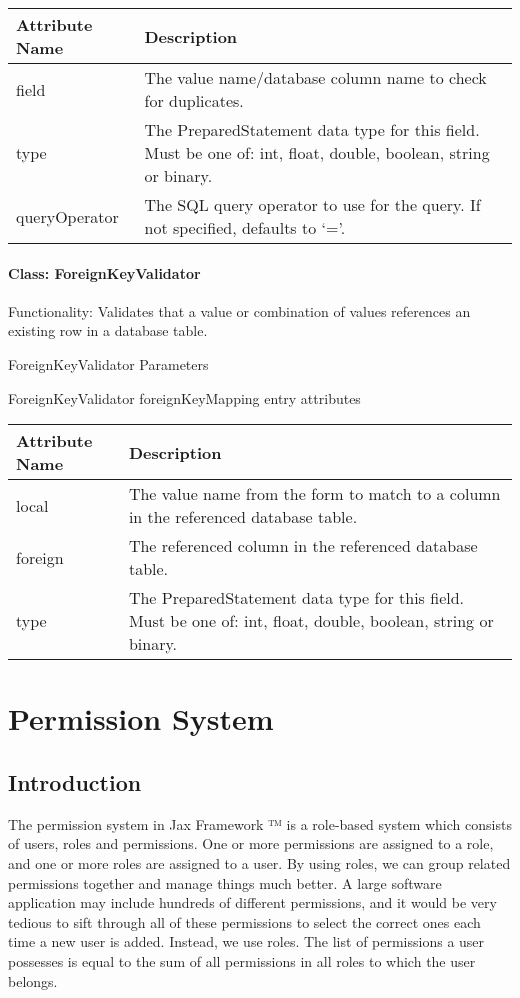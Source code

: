 \documentclass[letterpaper,10pt,english]{sphinxmanual}
\begin{document}
\begin{tabulary}{\linewidth}{|L|L|}
\hline
\textsf{\relax 
Attribute Name
} & \textsf{\relax 
Description
}\\
\hline
field
 & 
The value name/database column name to check for duplicates.
\\
\hline
type
 & 
The PreparedStatement data type for this field.  Must be one of: int, float, double,
boolean, string or binary.
\\
\hline
queryOperator
 & 
The SQL query operator to use for the query.  If not specified, defaults to `='.
\\
\hline\end{tabulary}



\subsubsection{Class: ForeignKeyValidator}
\label{jaxFrameworkGuide:class-foreignkeyvalidator}
Functionality: Validates that a value or combination of values references an existing row in a
database table.

ForeignKeyValidator Parameters

ForeignKeyValidator foreignKeyMapping entry attributes

\begin{tabulary}{\linewidth}{|L|L|}
\hline
\textsf{\relax 
Attribute Name
} & \textsf{\relax 
Description
}\\
\hline
local
 & 
The value name from the form to match to a column in the referenced database table.
\\
\hline
foreign
 & 
The referenced column in the referenced database table.
\\
\hline
type
 & 
The PreparedStatement data type for this field.  Must be one of: int, float, double,
boolean, string or binary.
\\
\hline\end{tabulary}



\chapter{Permission System}
\label{jaxFrameworkGuide:permission-system}

\section{Introduction}
\label{jaxFrameworkGuide:id23}
The permission system in Jax Framework ™ is a role-based system which consists of users, roles
and permissions.  One or more permissions are assigned to a role, and one or more roles are assigned
to a user.  By using roles, we can group related permissions together and manage things much better.
A large software application may include hundreds of different permissions, and it would be very
tedious to sift through all of these permissions to select the correct ones each time a new user is
added.  Instead, we use roles.  The list of permissions a user possesses is equal to the sum of all
permissions in all roles to which the user belongs.
\end{document}
